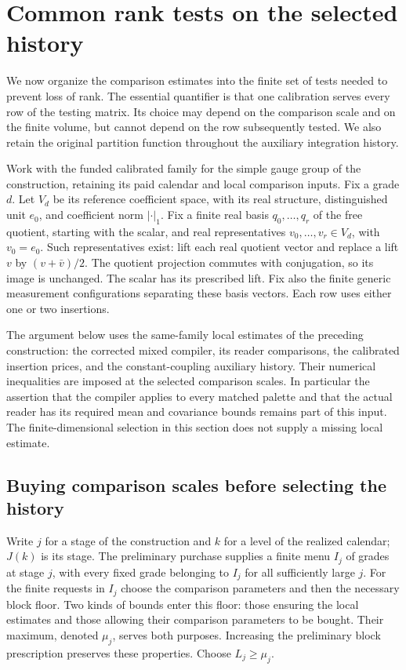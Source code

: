 \section{Common rank tests on the selected history}
\label{sec:actual-rank-purchases}

We now organize the comparison estimates into the finite set of tests
needed to prevent loss of rank. The essential quantifier is that one
calibration serves every row of the testing matrix. Its choice may depend
on the comparison scale and on the finite volume, but cannot depend on
the row subsequently tested. We also retain the original partition
function throughout the auxiliary integration history.

Work with the funded calibrated family for the simple gauge group of the
construction, retaining its paid calendar and local comparison inputs.
Fix a grade $d$. Let $V_d$ be its reference coefficient space, with its
real structure, distinguished unit $e_0$, and coefficient norm $|\cdot|_1$.
Fix a finite real basis $q_0,\ldots,q_r$ of the free quotient, starting
with the scalar, and real representatives $v_0,\ldots,v_r\in V_d$,
with $v_0=e_0$. Such representatives exist: lift each real quotient vector
and replace a lift $v$ by $(v+\bar v)/2$. The quotient projection commutes
with conjugation, so its image is unchanged. The scalar has its prescribed
lift. Fix also the finite generic measurement configurations separating
these basis vectors. Each row uses either one or two insertions.

The argument below uses the same-family local estimates of the preceding
construction: the corrected mixed compiler, its reader comparisons, the
calibrated insertion prices, and the constant-coupling auxiliary history.
Their numerical inequalities are imposed at the selected comparison
scales. In particular the assertion that the compiler applies to every
matched palette and that the actual reader has its required mean and
covariance bounds remains part of this input. The finite-dimensional
selection in this section does not supply a missing local estimate.

\subsection{Buying comparison scales before selecting the history}

Write $j$ for a stage of the construction and $k$ for a level of the
realized calendar; $J(k)$ is its stage. The preliminary purchase supplies
a finite menu $I_j$ of grades at stage $j$, with every fixed grade belonging
to $I_j$ for all sufficiently large $j$. For the finite requests in $I_j$
choose the comparison parameters and then the necessary block floor.
Two kinds of bounds enter this floor: those ensuring the local estimates
and those allowing their comparison parameters to be bought. Their
maximum, denoted $\mu_j$, serves both purposes. Increasing the preliminary
block prescription preserves these properties. Choose $L_j\ge\mu_j$.

